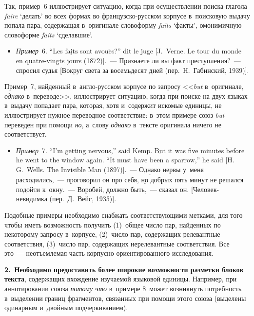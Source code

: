 \begin{multicols}{2}
Так, пример~6 иллюстрирует ситуацию, когда при осуществлении поиска 
глагола \textit{faire} `делать' во всех формах во фран\-цуз\-ско-рус\-ском 
корпусе в~поисковую выдачу попала пара, содержащая в~оригинале 
словоформу \textit{faits} `факты', омонимичную словоформе \textit{faits} 
`сделавшие'.

\begin{itemize}
\item[\,] \textit{Пример}~6. ``Les $\underline{\mbox{faits}}$ sont 
avou$\acute{\mbox{e}}$s?'' dit le juge [J.~Verne. Le tour du monde en quatre-vingts 
jours (1872)].~--- Признаете ли вы факт преступления?~--- спросил судья [Вокруг 
света за восемьдесят дней (пер.\ Н.~Габинский, 1939)].
\end{itemize}

Пример~7, найденный в~анг\-ло-рус\-ском корпусе по запросу <<\textit{but} 
в~оригинале, \textit{однако} в~переводе>>, иллюстрирует ситуацию, когда 
при поиске на двух языках в~выдачу попадает пара, которая, хотя и~содержит 
искомые единицы, не иллюстрирует нужное переводное соответствие: в~этом 
примере союз \textit{but} переведен при помощи \textit{но}, а~слову \textit{однако} 
в~текс\-те оригинала ничего не соответствует.

\begin{itemize}
\item[\,]
\textit{Пример}~7. ``I'm getting nervous,'' said Kemp. $\underline{\mbox{But}}$ it was 
five minutes before he went to the window again. ``It must have been a sparrow,'' he said 
[H.\,G.~Wells. The Invisible Man (1897)].~--- $\underline{\mbox{Однако}}$ нервы 
у~меня расходились,~--- проговорил он про себя, $\underline{\mbox{но}}$ добрых 
пять минут не решался подойти к~окну.~--- Воробей, должно быть,~--- сказал он. 
[Че\-ло\-век-не\-ви\-дим\-ка (пер.\ Д.~Вейс, 1935)].
\end{itemize}

Подобные примеры необходимо снабжать соответствующими метками, для 
того чтобы иметь возможность получить (1)~общее чис\-ло пар, найденных по 
некоторому запросу в~корпусе, (2)~чис\-ло пар, содержащих релевантные 
соответствия, (3)~чис\-ло пар, содержащих нерелевантные соответствия. Все 
это~--- неотъемлемая часть кор\-пус\-но-ори\-ен\-ти\-ро\-ван\-но\-го 
исследования.

\textbf{2.~Необходимо предоставить более широкие возможности 
разметки блоков текста}, содержащих вхож\-де\-ние изуча\-емой языковой 
единицы. Например, при аннотировании союза \textit{потому что} 
в~примере 8~может возникнуть по\-треб\-ность в~выделении границ 
фрагментов, связанных при помощи этого союза (выделены одинарным 
и~двойным подчеркиванием).


\end{multicols}
